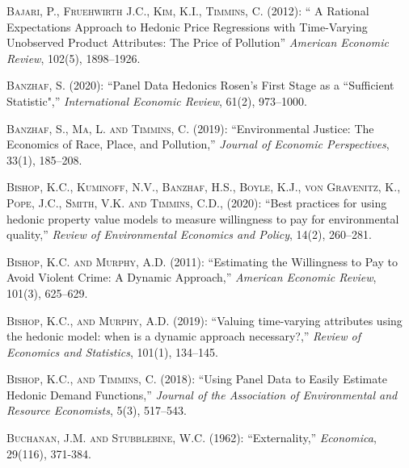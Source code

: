 \documentclass[ecta,nameyear,draft]{econsocart}
\theoremstyle{plain}
\theoremstyle{remark}
\begin{document}
\begin{thebibliography}{}
%

\textsc{Bajari, P., Fruehwirth J.C., Kim, K.I., Timmins, C.} (2012):
`` A Rational Expectations Approach to Hedonic Price Regressions with Time-Varying Unobserved Product Attributes: The Price of Pollution''
\textit{American Economic Review}, 102(5), 1898--1926.
\endbibitem

\textsc{Banzhaf, S.} (2020):
``Panel Data Hedonics Rosen’s First Stage as a “Sufficient
Statistic",''
\textit{International Economic Review}, 61(2), 973--1000.
\endbibitem


\textsc{Banzhaf, S., Ma, L. and Timmins, C.} (2019):
``Environmental Justice: The Economics of Race, Place, and Pollution,''
\textit{Journal of Economic Perspectives}, 33(1), 185--208.
\endbibitem

\textsc{Bishop, K.C., Kuminoff, N.V., Banzhaf, H.S., Boyle, K.J., von Gravenitz, K., Pope, J.C., Smith, V.K. and Timmins, C.D., } (2020):
``Best practices for using hedonic property value models to measure willingness to pay for environmental quality,''
\textit{Review of Environmental Economics and Policy}, 14(2), 260--281.
\endbibitem

\textsc{Bishop, K.C. and Murphy, A.D.} (2011):
``Estimating the Willingness to Pay to Avoid Violent Crime: A Dynamic Approach,''
\textit{American Economic Review}, 101(3), 625--629.
\endbibitem

\textsc{Bishop, K.C., and Murphy, A.D.} (2019):
``Valuing time-varying attributes using the hedonic model: when is a dynamic approach necessary?,''
\textit{Review of Economics and Statistics}, 101(1), 134--145.
\endbibitem

\textsc{Bishop, K.C., and Timmins, C.} (2018):
``Using Panel Data to Easily Estimate Hedonic Demand Functions,''
\textit{Journal of the Association of Environmental and Resource Economists}, 5(3), 517--543.
\endbibitem

\textsc{Buchanan, J.M. and Stubblebine, W.C.} (1962):
``Externality,''
\textit{Economica}, 29(116), 371-384.
\endbibitem


\end{thebibliography}
\end{document}
